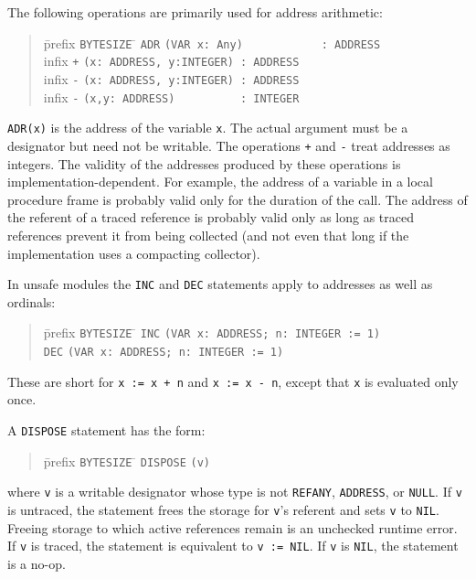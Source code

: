 \documentclass[10pt]{article}
\begin{document}
The following operations are primarily used for address arithmetic:
\begin{quote}
  \begin{tabbing}
    \=prefix \= \verb|BYTESIZE| \= \kill
    \>       \> \verb|ADR| \> \verb|(VAR x: Any)            : ADDRESS| \\
    \>infix  \> \verb|+|   \> \verb|(x: ADDRESS, y:INTEGER) : ADDRESS| \\
    \>infix  \> \verb|-|   \> \verb|(x: ADDRESS, y:INTEGER) : ADDRESS| \\
    \>infix  \> \verb|-|   \> \verb|(x,y: ADDRESS)          : INTEGER|
  \end{tabbing}
\end{quote}
\verb|ADR(x)| is the address of the variable \verb|x|.  The actual argument
must be a designator but need not be writable.  The operations \verb|+| and
\verb|-| treat addresses as integers.  The validity of the addresses produced
by these operations is implementation-dependent.  For example, the address of
a variable in a local procedure frame is probably valid only for the duration
of the call.  The address of the referent of a traced reference is probably
valid only as long as traced references prevent it from being collected (and
not even that long if the implementation uses a compacting collector).

In unsafe modules the \verb|INC| and \verb|DEC| statements apply to addresses
as well as ordinals:
\begin{quote}
  \begin{tabbing}
    \=prefix \= \verb|BYTESIZE| \= \kill
    \> \verb|INC| \> \verb|(VAR x: ADDRESS; n: INTEGER := 1)| \\
    \> \verb|DEC| \> \verb|(VAR x: ADDRESS; n: INTEGER := 1)|
  \end{tabbing}
\end{quote}
These are short for \verb|x := x + n| and \verb|x := x - n|, except that
\verb|x| is evaluated only once.

A \verb|DISPOSE| statement has the form:
\begin{quote}
  \begin{tabbing}
    \=prefix \= \verb|BYTESIZE| \= \kill
    \>       \> \verb|DISPOSE|  \> \verb|(v)|
  \end{tabbing}
\end{quote}
where \verb|v| is a writable designator whose type is not \verb|REFANY|,
\verb|ADDRESS|, or \verb|NULL|.  If \verb|v| is untraced, the statement frees
the storage for \verb|v|'s referent and sets \verb|v| to \verb|NIL|.  Freeing
storage to which active references remain is an unchecked runtime error.  If
\verb|v| is traced, the statement is equivalent to \verb|v := NIL|.  If
\verb|v| is \verb|NIL|, the statement is a no-op.
\end{document}
